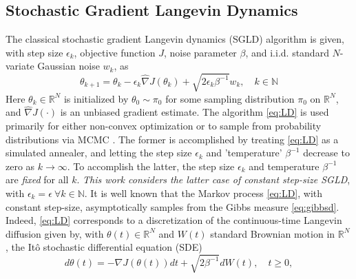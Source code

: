 \documentclass[journal,onecolumn]{IEEEtran}
\newcommand{\thk}{\theta_k}
\newcommand{\thkk}{\theta_{k+1}}
\newcommand{\step}{\epsilon}
\newcommand{\grad}{\nabla}
\newcommand{\gradn}{\hat{\nabla}}
\newcommand{\rew}{J}
\newcommand{\reals}{\mathbb{R}}
\newcommand{\noisek}{w_k}
\newcommand{\brownt}{W(t)}
\newcommand{\dimn}{N}
\newcommand{\gibbs}{\ids_{\infty}}
\newcommand{\idistr}{\ids_0}
\newcommand{\N}{\mathbb{N}}
\newcommand{\ids}{\pi}
\newcommand{\gibbsnorm}{\Lambda}
\begin{document}
\subsection{Stochastic Gradient Langevin Dynamics}
The classical stochastic gradient Langevin dynamics (SGLD) algorithm is given, with step size $\step_k$, objective function $\rew$, noise parameter $\beta$, and i.i.d. standard $\dimn$-variate Gaussian noise $w_k$,  as 
\begin{equation}
    \label{eq:LD}
    \thkk = \thk - \step_k \gradn \rew (\thk) + \sqrt{2 \step_k \beta^{-1}}\noisek, \quad k\in  \N
\end{equation}
Here $\theta_k \in \reals^{\dimn}$ is initialized by $\theta_0 \sim \idistr$ for some sampling distribution $\idistr$ on $\reals^{\dimn}$, and $\gradn\rew(\cdot)$ is an unbiased gradient estimate. The algorithm \eqref{eq:LD} is used primarily for either non-convex optimization \cite{xu2018global} or to sample from probability distributions via MCMC \cite{welling2011bayesian}. The former is accomplished by treating \eqref{eq:LD} as a simulated annealer, and letting the step size $\step_k$ and 'temperature' $\beta^{-1}$ decrease to zero as $k\to \infty$. To accomplish the latter, the step size $\step_k$ and temperature $\beta^{-1}$ are \textit{fixed} for all $k$. \textit{This work considers the latter case of constant step-size SGLD}, with $\step_k = \step \ \forall k \in \N$. It is well known that the Markov process \eqref{eq:LD}, with constant step-size, asymptotically samples from the Gibbs measure \eqref{eq:gibbsd}.
Indeed, \eqref{eq:LD} corresponds to a discretization of the continuous-time Langevin diffusion given by, with $\theta(t) \in \reals^{\dimn}$ and $\brownt$ standard Brownian motion in $\reals^{\dimn}$, the It\^o stochastic differential equation (SDE)
\begin{equation}
\label{eq:langdiff}
    d\theta(t) = -\grad \rew(\theta(t))dt + \sqrt{2\beta^{-1}}d\brownt, \quad t\geq 0,
\end{equation}
\end{document}
